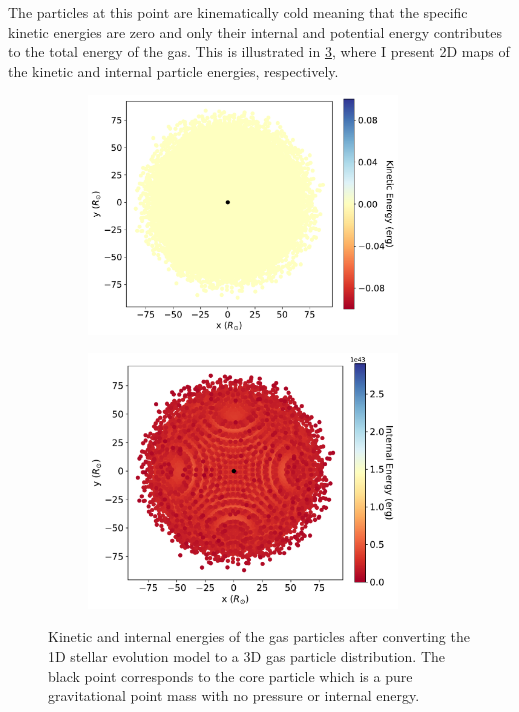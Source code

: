 The particles at this point are kinematically cold meaning that the specific kinetic energies are zero and only their internal and potential energy contributes to the total energy of the gas. This is illustrated in \cref{fig:kinetic_internal_energies}, where I present 2D maps of the kinetic and internal particle energies, respectively.
\begin{figure}[H]
    \centering
    \begin{subfigure}{.5\textwidth}
    \centering
    \includegraphics[width=0.9\textwidth]{Thesis/graphs/tertiary_kin_energy_before_relaxation.pdf}
    \label{fig:mass_loss}
    \end{subfigure}%
    \begin{subfigure}{.5\textwidth}
    \centering
    \includegraphics[width=0.9\textwidth]{Thesis/graphs/tertiary_internal_energy_before_relaxation.pdf}
    \label{fig:radius_profile}
    \end{subfigure}
    \caption{ Kinetic and internal energies of the gas particles after converting the 1D stellar evolution model to a 3D gas particle distribution. The black point corresponds to the core particle which is a pure gravitational point mass with no pressure or internal energy.}
    \label{fig:kinetic_internal_energies}
\end{figure}

